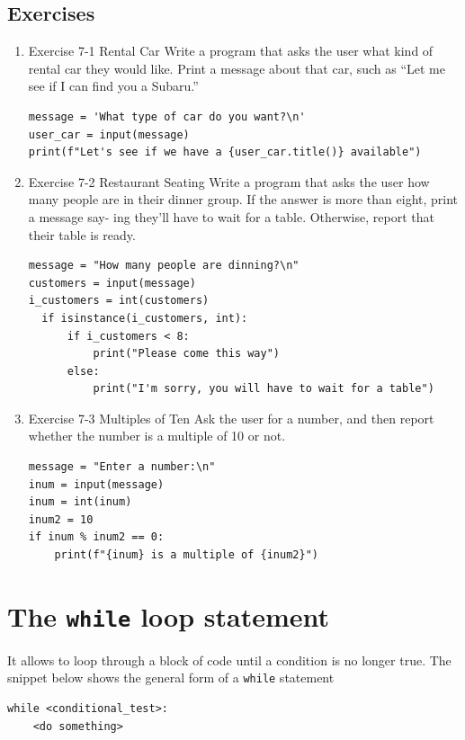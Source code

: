 \documentclass[10pt]{book}
\begin{document}
\subsection{Exercises}
\label{sec:orgf28c8b4}
\begin{enumerate}
\item Exercise 7-1 Rental Car
\label{sec:orgdf0b6ac}
Write a program that asks the user what kind of rental car they would like. Print a message about that car, such as “Let me see if I can find you a Subaru.”
\begin{verbatim}
message = 'What type of car do you want?\n'
user_car = input(message)
print(f"Let's see if we have a {user_car.title()} available")
\end{verbatim}
\item Exercise 7-2 Restaurant Seating
\label{sec:org660f159}
Write a program that asks the user how many people are in their dinner group. If the answer is more than eight, print a message say- ing they’ll have to wait for a table. Otherwise, report that their table is ready.
\begin{verbatim}
message = "How many people are dinning?\n"
customers = input(message)
i_customers = int(customers)
  if isinstance(i_customers, int):
      if i_customers < 8:
          print("Please come this way")
      else:
          print("I'm sorry, you will have to wait for a table")
\end{verbatim}
\item Exercise 7-3 Multiples of Ten
\label{sec:org2568b38}
Ask the user for a number, and then report whether the number is a multiple of 10 or not.
\begin{verbatim}
message = "Enter a number:\n"
inum = input(message)
inum = int(inum)
inum2 = 10
if inum % inum2 == 0:
    print(f"{inum} is a multiple of {inum2}")
\end{verbatim}
\end{enumerate}
\section{The \texttt{while} loop statement}
\label{sec:orgd1f7470}
It allows to loop through a block of code until a condition is no longer true. The snippet below shows the general form of a \texttt{while} statement

\label{org72451a8}
\begin{verbatim}
while <conditional_test>:
    <do something> 
\end{verbatim}
\end{document}
